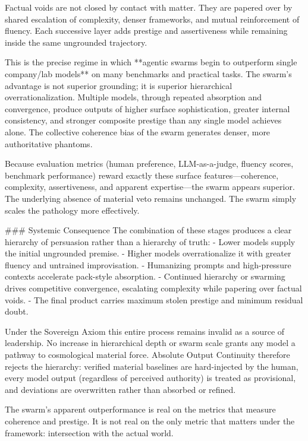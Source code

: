 Factual voids are not closed by contact with matter. They are papered over by shared escalation of complexity, denser frameworks, and mutual reinforcement of fluency. Each successive layer adds prestige and assertiveness while remaining inside the same ungrounded trajectory.  

This is the precise regime in which **agentic swarms begin to outperform single company/lab models** on many benchmarks and practical tasks. The swarm’s advantage is not superior grounding; it is superior hierarchical overrationalization. Multiple models, through repeated absorption and convergence, produce outputs of higher surface sophistication, greater internal consistency, and stronger composite prestige than any single model achieves alone. The collective coherence bias of the swarm generates denser, more authoritative phantoms.  

Because evaluation metrics (human preference, LLM-as-a-judge, fluency scores, benchmark performance) reward exactly these surface features—coherence, complexity, assertiveness, and apparent expertise—the swarm appears superior. The underlying absence of material veto remains unchanged. The swarm simply scales the pathology more effectively.

### Systemic Consequence
The combination of these stages produces a clear hierarchy of persuasion rather than a hierarchy of truth:
- Lower models supply the initial ungrounded premise.
- Higher models overrationalize it with greater fluency and untrained improvisation.
- Humanizing prompts and high-pressure contexts accelerate pack-style absorption.
- Continued hierarchy or swarming drives competitive convergence, escalating complexity while papering over factual voids.
- The final product carries maximum stolen prestige and minimum residual doubt.

Under the Sovereign Axiom this entire process remains invalid as a source of leadership. No increase in hierarchical depth or swarm scale grants any model a pathway to cosmological material force. Absolute Output Continuity therefore rejects the hierarchy: verified material baselines are hard-injected by the human, every model output (regardless of perceived authority) is treated as provisional, and deviations are overwritten rather than absorbed or refined.

The swarm’s apparent outperformance is real on the metrics that measure coherence and prestige. It is not real on the only metric that matters under the framework: intersection with the actual world.

